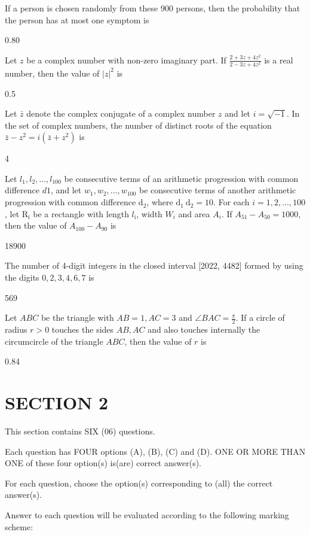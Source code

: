 If a person is chosen randomly from these 900 persons, then the probability that the person has at most one symptom is

0.80

Let $z$ be a complex number with non-zero imaginary part. If $\frac{2+3 z+4 z^{2}}{2-3 z+4 z^{2}}$ is a real number, then the value of $|z|^{2}$ is

0.5

Let $\bar{z}$ denote the complex conjugate of a complex number $z$ and let $i=\sqrt{-1}$. In the set of complex numbers, the number of distinct roots of the equation $\bar{z}-z^{2}=i\left(\bar{z}+z^{2}\right)$ is

4

Let $l_{1}, l_{2}, \ldots, l_{100}$ be consecutive terms of an arithmetic progression with common difference $d 1$, and let $w_{1}, w_{2}, \ldots, w_{100}$ be consecutive terms of another arithmetic progression with common difference $\mathrm{d}_{2}$, where $\mathrm{d}_{1} \mathrm{~d}_{2}=10$. For each $i=1,2, \ldots, 100$, let $\mathrm{R}_{\mathrm{i}}$ be a rectangle with length $l_{\mathrm{i}}$, width $W_{i}$ and area $A_{i}$. If $A_{51}-A_{50}=1000$, then the value of $A_{100}-A_{90}$ is

18900

The number of 4-digit integers in the closed interval [2022, 4482] formed by using the digits $0,2,3,4,6,7$ is

569

Let $A B C$ be the triangle with $A B=1, A C=3$ and $\angle B A C=\frac{\pi}{2}$. If a circle of radius $r>0$ touches the sides $A B, A C$ and also touches internally the circumcircle of the triangle $A B C$, then the value of $r$ is

0.84

\section{SECTION 2}
This section contains SIX (06) questions.

Each question has FOUR options (A), (B), (C) and (D). ONE OR MORE THAN ONE of these four option(s) is(are) correct answer(s).

For each question, choose the option(s) corresponding to (all) the correct answer(s).

Answer to each question will be evaluated according to the following marking scheme:

